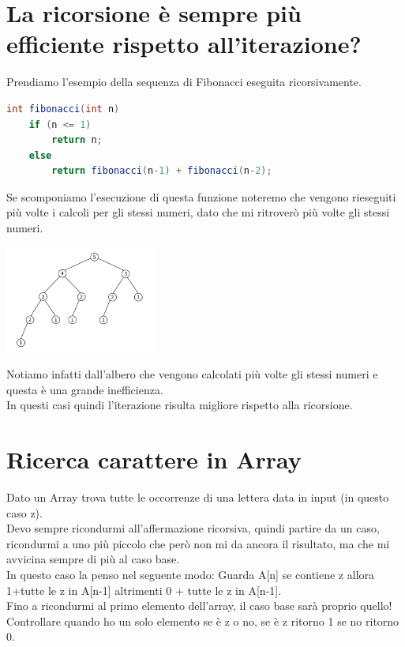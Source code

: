 \section{La ricorsione è sempre più efficiente rispetto all'iterazione?}
Prendiamo l'esempio della sequenza di Fibonacci eseguita ricorsivamente.
\begin{lstlisting}[language=Java]
int fibonacci(int n)
    if (n <= 1)
        return n;
    else 
        return fibonacci(n-1) + fibonacci(n-2);
\end{lstlisting}
Se scomponiamo l'esecuzione di questa funzione noteremo che vengono rieseguiti più volte
i calcoli per gli stessi numeri, dato che mi ritroverò più volte gli stessi numeri.
\begin{center}
    \includegraphics[width=50mm]{img/Fibonacci_Tree.png}
\end{center}
Notiamo infatti dall'albero che vengono calcolati più volte gli stessi numeri e questa
è una grande inefficienza.\\
In questi casi quindi l'iterazione risulta migliore rispetto alla ricorsione.
\section{Ricerca carattere in Array}
Dato un Array trova tutte le occorrenze di una lettera data in input (in questo caso z).\\
Devo sempre ricondurmi all'affermazione ricorsiva, quindi partire da un caso, ricondurmi
a uno più piccolo che però non mi da ancora il risultato, ma che mi avvicina sempre di più
al caso base.\\
In questo caso la penso nel seguente modo: Guarda A[n] se contiene z allora 1+tutte le z
in A[n-1] altrimenti 0 + tutte le z in A[n-1].\\
Fino a ricondurmi al primo elemento dell'array, il caso base sarà proprio quello! 
Controllare quando ho un solo elemento se è z o no, se è z ritorno 1 se no ritorno 0.
